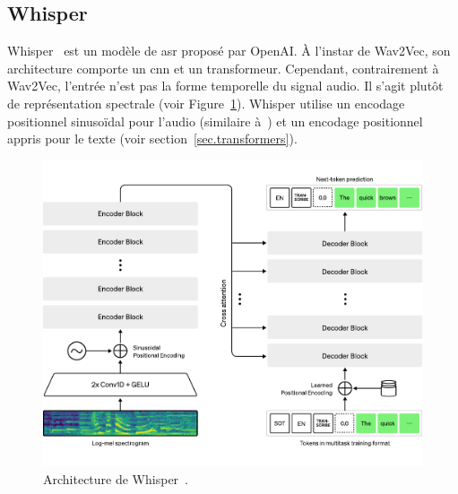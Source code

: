 \subsection{Whisper}

Whisper~\cite{Radford_Kim_Xu_Brockman_McLeavey_Sutskever_2022} est un modèle de \gls{asr} proposé par OpenAI.
À l'instar de Wav2Vec, son architecture comporte un \gls{cnn} et un transformeur.
Cependant, contrairement à Wav2Vec, l'entrée n'est pas la forme temporelle du signal audio.
Il s'agit plutôt de représentation spectrale (voir Figure~\ref{fig.whisper}).
Whisper utilise un encodage positionnel sinusoïdal pour l'audio (similaire à~\cite{attention})
et un encodage positionnel appris pour le texte (voir section~\ref{sec.transformers}).

\begin{figure}[hbt]
    \centering
    \includegraphics[width=.5\linewidth]{assets/pdf/whisper.pdf}
    \caption[Architecture de Whisper.]
    {Architecture de Whisper~\cite{Radford_Kim_Xu_Brockman_McLeavey_Sutskever_2022}.}
    \label{fig.whisper}
\end{figure}